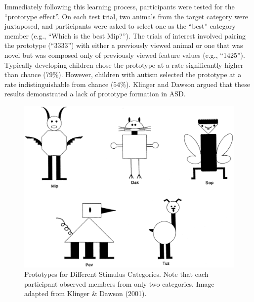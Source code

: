 Immediately following this learning process, participants were tested for the ``prototype effect''. On each test trial, two animals from the target category were juxtaposed, and participants were asked to select one as the ``best'' category member (e.g., ``Which is the best Mip?''). The trials of interest involved pairing the prototype (``3333'') with either a previously viewed animal or one that was novel but was composed only of previously viewed feature values (e.g., ``1425''). Typically developing children chose the prototype at a rate significantly higher than chance ($79\%$). However, children with autism selected the prototype at a rate indistinguishable from chance ($54\%$).
Klinger and Dawson argued that these results demonstrated a lack of prototype formation in ASD.

\begin{figure}[ht]
\begin{center}
	\includegraphics[width=160mm]{figures/prototype_categories.eps}
\end{center}
\caption{Prototypes for Different Stimulus Categories. Note that each participant observed members from only two categories. Image adapted from Klinger \& Dawson (2001).}
\label{prototype-categories}
\end{figure} 

